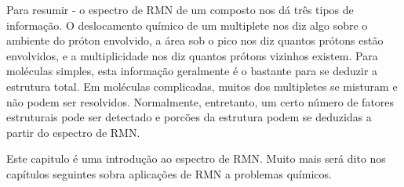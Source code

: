 Para resumir - o espectro de RMN de um composto nos dá três tipos de informação. O deslocamento químico de um multiplete nos diz algo sobre o ambiente do próton envolvido, a área sob o pico nos diz quantos prótons estão envolvidos, e a multiplicidade nos diz quantos prótons vizinhos existem. Para moléculas simples, esta informação geralmente é o bastante para se deduzir a estrutura total. Em moléculas complicadas, muitos dos multipletes se misturam e não podem ser resolvidos. Normalmente, entretanto, um certo número de fatores estruturais pode ser detectado e porcões da estrutura podem se deduzidas a partir do espectro de RMN.

Este capitulo é uma introdução ao espectro de RMN. Muito mais será dito nos capítulos seguintes sobra aplicações de RMN a problemas químicos.


